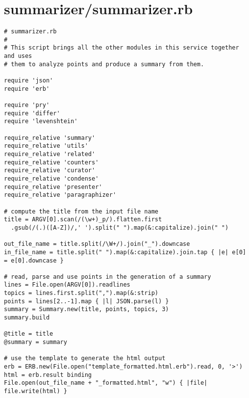 \documentclass{article}
\begin{document}
\section*{summarizer/summarizer.rb}
\begin{verbatim}
# summarizer.rb
#
# This script brings all the other modules in this service together and uses
# them to analyze points and produce a summary from them.

require 'json'
require 'erb'

require 'pry'
require 'differ'
require 'levenshtein'

require_relative 'summary'
require_relative 'utils'
require_relative 'related'
require_relative 'counters'
require_relative 'curator'
require_relative 'condense'
require_relative 'presenter'
require_relative 'paragraphizer'

# compute the title from the input file name
title = ARGV[0].scan(/(\w+)_p/).flatten.first
  .gsub(/(.)([A-Z])/,' ').split(" ").map(&:capitalize).join(" ")

out_file_name = title.split(/\W+/).join("_").downcase
in_file_name = title.split(" ").map(&:capitalize).join.tap { |e| e[0] = e[0].downcase }

# read, parse and use points in the generation of a summary
lines = File.open(ARGV[0]).readlines
topics = lines.first.split(",").map(&:strip)
points = lines[2..-1].map { |l| JSON.parse(l) }
summary = Summary.new(title, points, topics, 3)
summary.build

@title = title
@summary = summary

# use the template to generate the html output
erb = ERB.new(File.open("template_formatted.html.erb").read, 0, '>')
html = erb.result binding
File.open(out_file_name + "_formatted.html", "w") { |file| file.write(html) }


\end{verbatim}
\pagebreak
\end{document}
